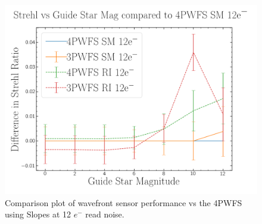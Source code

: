 \begin{figure}[h]
    \centering
    \includegraphics[width=.7\linewidth]{Chapter Materials/Chapter Four Materials/StrehlvGuideStarvs4PWFSRM12e.png}
    \caption{Comparison plot of wavefront sensor performance vs the 4PWFS using Slopes at 12 $e^-$ read noise.}
    \label{fig:12RN}
\end{figure}

\newpage